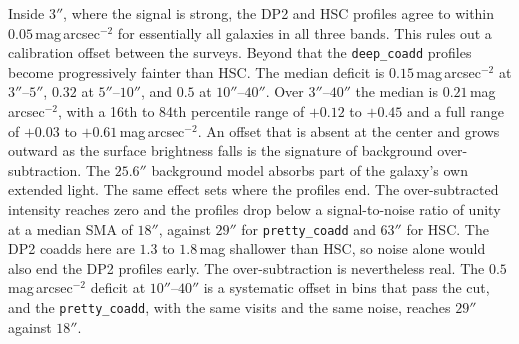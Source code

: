 \documentclass[SE,lsstdraft,authoryear,toc]{lsstdoc}
\begin{document}
Inside $3''$, where the signal is strong, the DP2 and HSC profiles agree to within $0.05$\,mag\,arcsec$^{-2}$ for essentially all galaxies in all three bands. This rules out a calibration offset between the surveys. Beyond that the \texttt{deep\_coadd} profiles become progressively fainter than HSC. The median deficit is $0.15$\,mag\,arcsec$^{-2}$ at $3''$--$5''$, $0.32$ at $5''$--$10''$, and $0.5$ at $10''$--$40''$. Over $3''$--$40''$ the median is $0.21$\,mag\,arcsec$^{-2}$, with a 16th to 84th percentile range of $+0.12$ to $+0.45$ and a full range of $+0.03$ to $+0.61$\,mag\,arcsec$^{-2}$. An offset that is absent at the center and grows outward as the surface brightness falls is the signature of background over-subtraction. The $25.6''$ background model absorbs part of the galaxy's own extended light. The same effect sets where the profiles end. The over-subtracted intensity reaches zero and the profiles drop below a signal-to-noise ratio of unity at a median SMA of $18''$, against $29''$ for \texttt{pretty\_coadd} and $63''$ for HSC. The DP2 coadds here are $1.3$ to $1.8$\,mag shallower than HSC, so noise alone would also end the DP2 profiles early. The over-subtraction is nevertheless real. The $0.5$\,mag\,arcsec$^{-2}$ deficit at $10''$--$40''$ is a systematic offset in bins that pass the cut, and the \texttt{pretty\_coadd}, with the same visits and the same noise, reaches $29''$ against $18''$.
\end{document}
